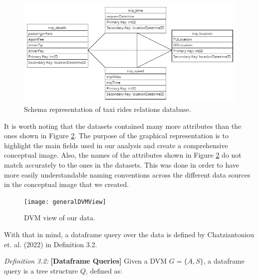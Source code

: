 \begin{center}
    \begin{figure}[h]
        \includegraphics[scale=0.3]{figures/schema.png}
        \caption{Schema representation of taxi rides relations database.}
        \label{schema}
    \end{figure}
\end{center}

It is worth noting that the datasets contained many more attributes than the ones shown in Figure \ref{dvm2}. The purpose of the graphical representation is to highlight the main fields used in our analysis and create a comprehensive conceptual image. Also, the names of the attributes shown in Figure \ref{dvm2} do not match accurately to the ones in the datasets. This was done in order to have more easily understandable naming conventions across the different data sources in the conceptual image that we created.

\begin{center}
    \begin{figure}[h]
        \texttt{[image: generalDVMView]}
        \caption{DVM view of our data.}
        \label{dvm2}
    \end{figure}
\end{center}

With that in mind, a dataframe query over the data is defined by Chatziantoniou et. al. (2022)\cite{chatziantoniou} in Definition 3.2.

\textit{Definition 3.2:} \textbf{[Dataframe Queries]} Given a DVM \(G = \{A, S\}\), a dataframe query is a tree structure \(Q\), defined as:

